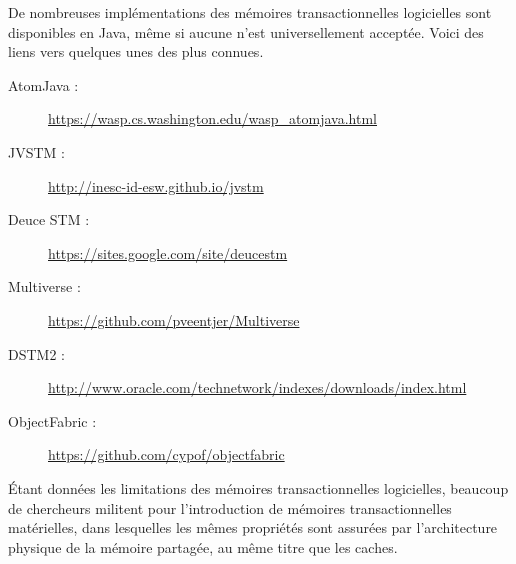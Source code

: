\documentclass{td}
\begin{document}
De nombreuses implémentations des mémoires transactionnelles logicielles sont disponibles en Java, même si aucune n'est universellement acceptée.
Voici des liens vers quelques unes des plus connues.

\begin{description}
\item [AtomJava :] \url{https://wasp.cs.washington.edu/wasp_atomjava.html}
\item [JVSTM :] \url{http://inesc-id-esw.github.io/jvstm}
\item [Deuce STM :] \url{https://sites.google.com/site/deucestm}
\item [Multiverse :] \url{https://github.com/pveentjer/Multiverse}
\item [DSTM2 :] \url{http://www.oracle.com/technetwork/indexes/downloads/index.html}
\item [ObjectFabric :] \url{https://github.com/cypof/objectfabric}
\end{description}

Étant données les limitations des mémoires transactionnelles logicielles, beaucoup de chercheurs militent pour l'introduction
de mémoires transactionnelles matérielles, dans lesquelles les mêmes propriétés sont assurées par l'architecture physique de
la mémoire partagée, au même titre que les caches.
\end{document}
